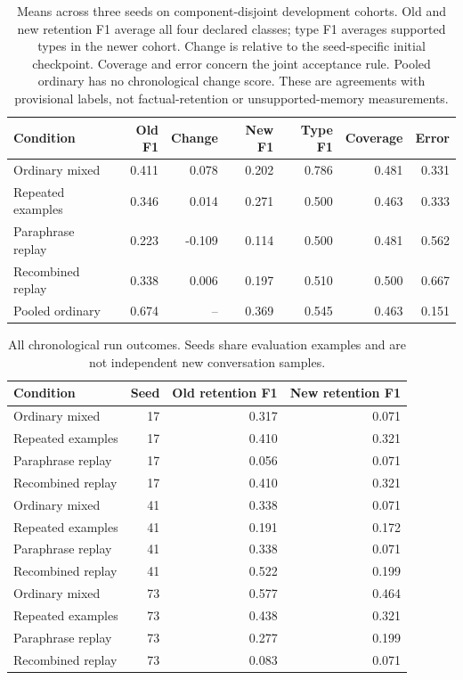 \begin{table}[htbp]
\centering\small
\begin{tabularx}{\linewidth}{@{}Yrrrrrr@{}}
\toprule
Condition & Old F1 & Change & New F1 & Type F1 & Coverage & Error\\
\midrule
Ordinary mixed & 0.411 & 0.078 & 0.202 & 0.786 & 0.481 & 0.331\\
Repeated examples & 0.346 & 0.014 & 0.271 & 0.500 & 0.463 & 0.333\\
Paraphrase replay & 0.223 & -0.109 & 0.114 & 0.500 & 0.481 & 0.562\\
Recombined replay & 0.338 & 0.006 & 0.197 & 0.510 & 0.500 & 0.667\\
Pooled ordinary & 0.674 & -- & 0.369 & 0.545 & 0.463 & 0.151\\
\bottomrule
\end{tabularx}
\caption{Means across three seeds on component-disjoint development cohorts. Old and new retention F1 average all four declared classes; type F1 averages supported types in the newer cohort. Change is relative to the seed-specific initial checkpoint. Coverage and error concern the joint acceptance rule. Pooled ordinary has no chronological change score. These are agreements with provisional labels, not factual-retention or unsupported-memory measurements.}
\label{tab:replay-comparison}
\end{table}

\begin{table}[htbp]
\centering\small
\begin{tabular}{lrrr}
\toprule
Condition & Seed & Old retention F1 & New retention F1\\
\midrule
Ordinary mixed & 17 & 0.317 & 0.071\\
Repeated examples & 17 & 0.410 & 0.321\\
Paraphrase replay & 17 & 0.056 & 0.071\\
Recombined replay & 17 & 0.410 & 0.321\\
Ordinary mixed & 41 & 0.338 & 0.071\\
Repeated examples & 41 & 0.191 & 0.172\\
Paraphrase replay & 41 & 0.338 & 0.071\\
Recombined replay & 41 & 0.522 & 0.199\\
Ordinary mixed & 73 & 0.577 & 0.464\\
Repeated examples & 73 & 0.438 & 0.321\\
Paraphrase replay & 73 & 0.277 & 0.199\\
Recombined replay & 73 & 0.083 & 0.071\\
\bottomrule
\end{tabular}
\caption{All chronological run outcomes. Seeds share evaluation examples and are not independent new conversation samples.}
\end{table}

